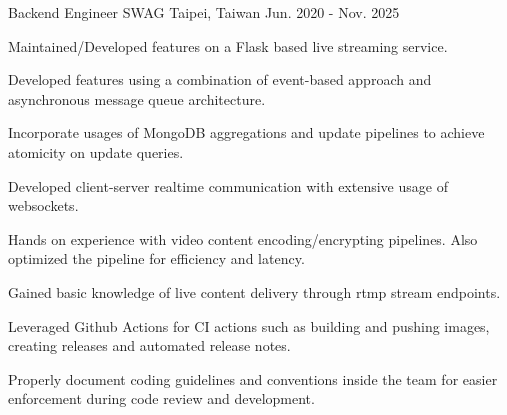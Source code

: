 \begin{cventries}
  \cventry
    {Backend Engineer} %
    {SWAG} %
    {Taipei, Taiwan} %
    {Jun. 2020 - Nov. 2025} %
    {
      \begin{cvitems} %
        \item {Maintained/Developed features on a Flask based live streaming service. }
        \item {Developed features using a combination of event-based approach and asynchronous message queue architecture. }
        \item {Incorporate usages of MongoDB aggregations and update pipelines to achieve atomicity on update queries. }
        \item {Developed client-server realtime communication with extensive usage of websockets. }
        \item {Hands on experience with video content encoding/encrypting pipelines. Also optimized the pipeline for efficiency and latency. }
        \item {Gained basic knowledge of live content delivery through rtmp stream endpoints.}
        \item {Leveraged Github Actions for CI actions such as building and pushing images, creating releases and automated release notes.}
        \item {Properly document coding guidelines and conventions inside the team for easier enforcement during code review and development. }
      \end{cvitems}
    }


\end{cventries}
